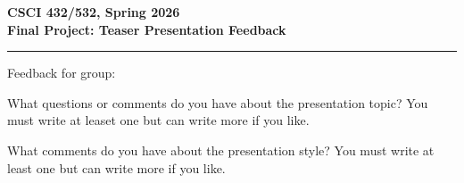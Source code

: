 \documentclass[11pt]{article}
\begin{document}
\pagestyle{empty}

\begin{center}
\Large\textbf{CSCI 432/532, Spring 2026}%
\\
\LARGE\textbf{Final Project: Teaser Presentation Feedback}%
\end{center}

\bigskip
\hrule
\bigskip

\noindent Feedback for group: \underline{\hspace{3in}}

\noindent What questions or comments do you have about the presentation topic? You must write at leaset one but can write more if you like.
\vspace{3.4in}

\noindent What comments do you have about the presentation style? You must write at least one but can write more if you like.

\end{document}
